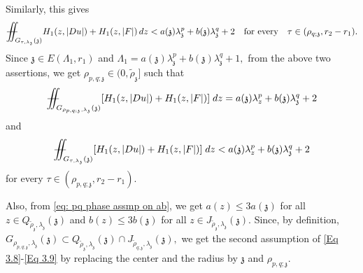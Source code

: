 \documentclass[11pt,oneside, english,reqno,twoside a4paper]{amsart}
\theoremstyle{definition}
\numberwithin{theorem}{section}
\numberwithin{equation}{section}
\newcommand{\iintss}{{\int\hspace{-0.28cm}\int}}
\newcommand{ \miints }{{\iintss\hspace{-0.56cm} -\hspace{-0.15cm}-}}
\newcommand{\miint}[1]{{\miints_{\hspace{-0.13cm}#1}}}
\begin{document}
Similarly, this gives
\begin{align*}
\miint{G_{\tau, \lambda_{\mathfrak z}}(\mathfrak z)}H_1(z, |Du|)+H_1(z, |F|)\, dz < a(\mathfrak z)\lambda^p_{\mathfrak z}+b(\mathfrak z)\lambda^q_{\mathfrak z}+2 \quad \text{for every}\quad \tau \in (\rho_{q; \mathfrak z}, r_2-r_1). 
\end{align*}
Since $\mathfrak z \in E(\Lambda_1, r_1)$ and $\Lambda_1=a(\mathfrak z)\lambda^p_{\mathfrak z}+b(\mathfrak z)\lambda^q_{\mathfrak z}+1,$ from the above two assertions, we get $\rho_{p, q; \mathfrak z}\in (0, \widetilde \rho_{\mathfrak z}]$ such that
\begin{equation}    \label{eq: choice condition 1 of pq phase}
    \miint{G_{\rho_{p,q; \mathfrak{z}},\lambda_\mathfrak{z}}(\mathfrak{z})} [H_1(z,|Du|)+H_1(z,|F|)]\; dz=a(\mathfrak{z})\lambda^p_{z}+b(\mathfrak{z})\lambda_\mathfrak{z}^q+2
\end{equation}
and
\begin{equation}    \label{eq: choice condition 2 of pq phase}
    \miint{G_{\tau,\lambda_\mathfrak{z}}(\mathfrak{z})} [H_1(z,|Du|)+H_1(z,|F|)]\; dz< a(\mathfrak{z})\lambda^p_{z}+b(\mathfrak{z})\lambda_\mathfrak{z}^q+2
\end{equation}
for every $\tau\in(\rho_{p, q; \mathfrak z},r_2-r_1).$

Also, from \eqref{eq: pq phase assmp on ab}, we get $a(z)\leq 3 a(\mathfrak z)$ for all $z \in Q_{\widetilde \rho_{\mathfrak z}, \lambda_{\mathfrak z}}(\mathfrak z)$ and $b(z)\leq 3 b(\mathfrak z)$ for all $z\in J_{\widetilde \rho_{\mathfrak z}, \lambda_{\mathfrak z}}(\mathfrak z).$ Since, by definition, $G_{\rho_{p, q; \mathfrak z}, \lambda_{\mathfrak z}}(\mathfrak z)\subset Q_{\widetilde \rho_{\mathfrak z}, \lambda_{\mathfrak z}}(\mathfrak z)\cap J_{\widetilde \rho_{q; \mathfrak z}, \lambda_{\mathfrak z}}(\mathfrak z),$ we get the second assumption of \eqref{Eq 3.8}-\eqref{Eq 3.9} by replacing the center and the radius by $\mathfrak z$ and $\rho_{p,q; \mathfrak z}.$

\end{document}

